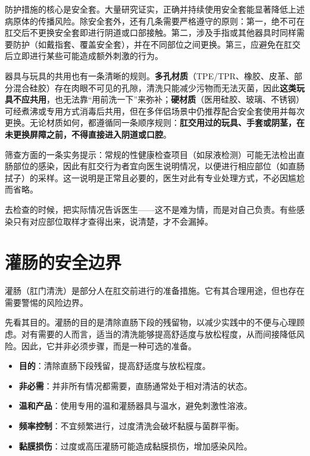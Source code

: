 \documentclass[12pt,UTF8]{ctexbook}
\newcommand{\keyword}[1]{\textbf{#1}}
\begin{document}
防护措施的核心是安全套。大量研究证实，正确并持续使用安全套能显著降低上述病原体的传播风险。除安全套外，还有几条需要严格遵守的原则：第一，绝不可在肛交后不更换安全套即进行阴道或口部接触。第二，涉及手指或其他器具时同样需要防护（如戴指套、覆盖安全套），并在不同部位之间更换。第三，应避免在肛交后立即进行某些可能造成额外刺激的行为。

器具与玩具的共用也有一条清晰的规则。\keyword{多孔材质}（TPE/TPR、橡胶、皮革、部分混合硅胶）存在肉眼不可见的孔隙，清洗只能减少污物而无法灭菌，因此\keyword{这类玩具不应共用}，也无法靠“用前洗一下”来弥补；\keyword{硬材质}（医用硅胶、玻璃、不锈钢）可经煮沸或专用方式消毒后共用，但在多伴侣场景中仍推荐配合安全套使用并每次更换。无论材质如何，都遵循同一条顺序规则：\keyword{肛交用过的玩具、手套或阴茎，在未更换屏障之前，不得直接进入阴道或口腔}。

筛查方面的一条实务提示：常规的性健康检查项目（如尿液检测）可能无法检出直肠部位的感染，因此有肛交行为者宜向医生说明情况，以便进行相应部位（如直肠拭子）的采样。这一说明是正常且必要的，医生对此有专业处理方式，不必因尴尬而省略。

\begin{tcolorbox}[colback=pink!5!white,colframe=red!50!black,title=贴心小叮咛]
去检查的时候，把实际情况告诉医生——这不是难为情，而是对自己负责。有些感染只有对应部位取样才查得出来，说清楚，才不会漏掉。
\end{tcolorbox}

\section{灌肠的安全边界}

灌肠（肛门清洗）是部分人在肛交前进行的准备措施。它有其合理用途，但也存在需要警惕的风险边界。

先看其目的。灌肠的目的是清除直肠下段的残留物，以减少实践中的不便与心理顾虑。对有需要的人而言，适当的清洗能够提高舒适度与放松程度，从而间接降低风险。因此，它并非必须步骤，而是一种可选的准备。

\begin{itemize}
\item \textbf{目的}：清除直肠下段残留，提高舒适度与放松程度。
\item \textbf{非必需}：并非所有情况都需要，直肠通常处于相对清洁的状态。
\item \textbf{温和产品}：使用专用的温和灌肠器具与温水，避免刺激性溶液。
\item \textbf{频率控制}：不宜频繁进行，过度清洗会破坏黏膜与菌群平衡。
\item \textbf{黏膜损伤}：过度或高压灌肠可能造成黏膜损伤，增加感染风险。
\end{itemize}
\end{document}
